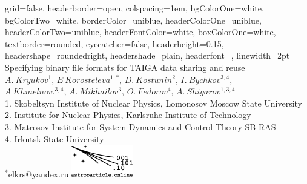 \documentclass[a0paper,portrait]{baposter}
\begin{document}


\begin{poster}
{
grid=false,
headerborder=open, %
colspacing=1em, %
bgColorOne=white, %
bgColorTwo=white, %
borderColor=uniblue, %
headerColorOne=uniblue, %
headerColorTwo=uniblue, %
headerFontColor=white, %
boxColorOne=white, %
textborder=rounded, %
eyecatcher=false, %
headerheight=0.15\textheight, %
headershape=roundedright, %
headershade=plain,
headerfont=\Large\textsf, %
linewidth=2pt %
}
{}
%
%
{
\textsf %
{Specifying binary file formats for TAIGA data sharing and reuse
}
} 
{\sf\vspace{0em}\\
$A.~Kryukov^{1}$, $E~Korosteleva^{1,*}$, $D.~Kostunin^{2}$, $I.~Bychkov^{3,4}$, \\ $A~Khmelnov.^{3,4}$, $A.~Mikhailov^{3}$, $O.~Fedorov^{4}$, $A.~Shigarov^{1,3,4}$
\vspace{0.1em}\\
\small{
1. Skobeltsyn Institute of Nuclear Physics, Lomonosov Moscow State University\\
2. Institute for Nuclear Physics, Karlsruhe Institute of Technology\\
3. Matrosov Institute for System Dynamics and Control Theory SB RAS\\
4. Irkutsk State University
\vspace{0.0em}\\
$^*$elkrs@yandex.ru}
}
{\includegraphics[width=0.20\textwidth]{logo_var1.pdf}
}
 

\end{poster}
\end{document}
